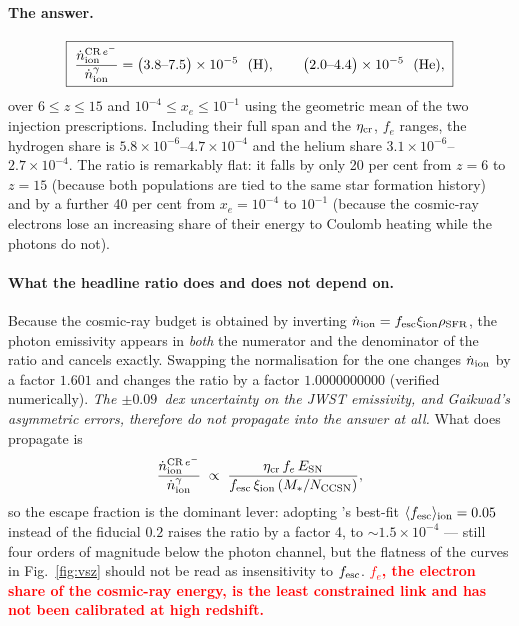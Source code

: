 \documentclass[11pt,a4paper]{article}
\newcommand{\flag}[1]{\textbf{\textcolor{red}{#1}}}
\begin{document}
\paragraph{The answer.}
\begin{equation}
  \boxed{\;
  \frac{\dot n_{\rm ion}^{{\rm CR}\,e^-}}{\dot n_{\rm ion}^{\gamma}}
  = \big(3.8\text{--}7.5\big)\times10^{-5} \ \ ({\rm H}),
  \qquad
  \big(2.0\text{--}4.4\big)\times10^{-5}\ \ ({\rm He}),
  \;}
\end{equation}
over $6\le z\le15$ and $10^{-4}\le x_e\le10^{-1}$ using the geometric mean of
the two injection prescriptions.  Including their full span and the
$\eta_{\rm cr}$, $f_e$ ranges, the hydrogen share is
$5.8\times10^{-6}$--$4.7\times10^{-4}$ and the helium share
$3.1\times10^{-6}$--$2.7\times10^{-4}$.  The ratio is remarkably flat: it
falls by only 20 per cent from $z=6$ to $z=15$ (because both populations are
tied to the same star formation history) and by a further 40 per cent from
$x_e=10^{-4}$ to $10^{-1}$ (because the cosmic-ray electrons lose an
increasing share of their energy to Coulomb heating while the photons do not).

\paragraph{What the headline ratio does and does not depend on.}
Because the cosmic-ray budget is obtained by inverting
$\dot n_{\rm ion} = f_{\rm esc}\xi_{\rm ion}\rho_{\rm SFR}$, the photon
emissivity appears in \emph{both} the numerator and the denominator of the
ratio and cancels exactly.  Swapping the \citet{Giovinazzo2026} normalisation
for the \citet{Gaikwad2023} one changes $\dot n_{\rm ion}$ by a factor
$1.601$ and changes the ratio by a factor $1.0000000000$ (verified
numerically).  \emph{The $\pm0.09$~dex uncertainty on the JWST emissivity, and
Gaikwad's asymmetric errors, therefore do not propagate into the answer at
all.}  What does propagate is
\begin{equation}
  \frac{\dot n_{\rm ion}^{{\rm CR}\,e^-}}{\dot n_{\rm ion}^{\gamma}}
  \;\propto\;
  \frac{\eta_{\rm cr}\,f_e\,E_{\rm SN}}
       {f_{\rm esc}\,\xi_{\rm ion}\,(M_\ast/N_{\rm CCSN})} ,
\end{equation}
so the escape fraction is the dominant lever: adopting
\citeauthor{Munoz2024}'s best-fit $\langle f_{\rm esc}\rangle_{\rm ion}=0.05$
instead of the \citet{Robertson2015} fiducial $0.2$ raises the ratio by a
factor 4, to $\sim1.5\times10^{-4}$ --- still four orders of magnitude below
the photon channel, but the flatness of the curves in Fig.~\ref{fig:vsz}
should not be read as insensitivity to $f_{\rm esc}$.
\flag{$f_e$, the electron share of the cosmic-ray energy, is the least
constrained link and has not been calibrated at high redshift.}
\end{document}
